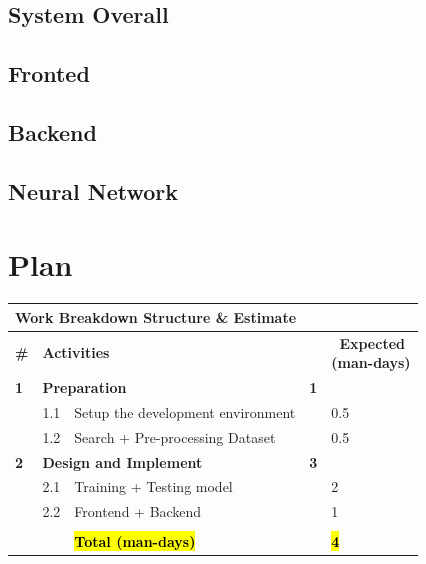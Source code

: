 \subsection{System Overall}
\subsection{Fronted}
\subsection{Backend}
\subsection{Neural Network}

\newpage
\section{Plan}
\begin{table}[h]
\begin{tabular}{|m{0.3cm}|m{1.0cm}|m{9.7cm}|m{1.6cm}|m{2.4cm}|}
\hline
\multicolumn{5}{|m{17cm}|}{\cellcolor{red!25} \large\textbf{Work Breakdown Structure \& Estimate}} 
\\
\hline
\textbf{\#} & \multicolumn{3}{|m{12.3cm}|}{\textbf{Activities}} & \pbox{2.4cm}{\textbf{~Expected} \\ \textbf{(man-days)}}
\\
\hline
\textbf{1} & \multicolumn{2}{|m{10.7cm}|}{\textbf{Preparation}} & \textbf{1} & 
\\
\hline
& 1.1 & Setup the development environment & & 0.5
\\
\hline
& 1.2 & Search + Pre-processing Dataset & & 0.5
\\
\hline
\textbf{2} & \multicolumn{2}{|m{10.7cm}|}{\textbf{Design and Implement}} & \textbf{3} &
\\
\hline 
& 2.1 & Training + Testing model & & 2
\\
\hline
& 2.2 & Frontend + Backend & & 1
\\
\hline
\multicolumn{2}{|m{1.3cm}|}{} & \multicolumn{2}{m{11.3cm}|}{} &
\\
\hline
\multicolumn{2}{|m{1.3cm}|}{} & \multicolumn{2}{m{11.3cm}|}{\hl{\textbf{Total (man-days)}}} & \hl{\textbf{4}}
\\
\hline

\end{tabular}%
\end{table}

\newpage

